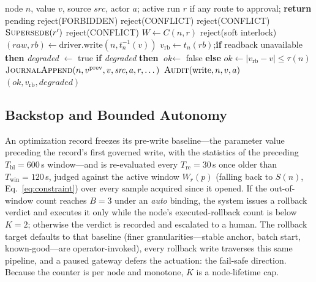 \begin{algorithm}[!t]
\caption{Governed write path $\textsc{Write}(n, v, \textit{src}, a)$}
\label{alg:write}
\begin{algorithmic}[1]
\Require node $n$, value $v$, source $\textit{src}$, actor $a$; active run $r$ if any
  \State route to approval; \textbf{return} pending 
\EndIf
{} \State \Return reject(FORBIDDEN)  \EndIf
{} \State \Return reject(CONFLICT) \EndIf
{}
   \State \Return reject(CONFLICT)
   \State $\textsc{Supersede}(r')$ \EndIf
   \State \Return reject(CONFLICT) \EndIf
\EndIf
\State $W \gets C(n, r)$ 
 \State \Return reject(soft interlock) \EndIf
\State $(\textit{raw}, \textit{rb}) \gets \text{driver.write}(n, t_n^{-1}(v))$
\State $v_{\text{rb}} \gets t_n(\textit{rb})$;\quad \textbf{if} readback unavailable \textbf{then} \textit{degraded} $\gets$ true
\State \textbf{if} \textit{degraded} \textbf{then} $\textit{ok} \gets$ false \textbf{else} $\textit{ok} \gets |v_{\text{rb}} - v| \le \tau(n)$ 
  \State $\textsc{JournalAppend}(n, v^{\text{prev}}, v, \textit{src}, a, r, \dots)$ 
  \State $\textsc{Audit}(\text{write}, n, v, a)$ 
  \State \Return $(\textit{ok}, v_{\text{rb}}, \textit{degraded})$
\end{algorithmic}
\end{algorithm}

\subsection{Backstop and Bounded Autonomy}
An optimization record freezes its pre-write baseline---the parameter value preceding the record's first governed write, with the statistics of the preceding $T_{\text{bl}} = 600$\,s window---and is re-evaluated every $T_{\text{re}} = 30$\,s once older than $T_{\text{win}} = 120$\,s, judged against the active window $W_r(p)$ (falling back to $S(n)$, Eq.~\eqref{eq:constraint}) over every sample acquired since it opened. If the out-of-window count reaches $B = 3$ under an \emph{auto} binding, the system issues a rollback verdict and executes it only while the node's executed-rollback count is below $K = 2$; otherwise the verdict is recorded and escalated to a human. The rollback target defaults to that baseline (finer granularities---stable anchor, batch start, known-good---are operator-invoked), every rollback write traverses this same pipeline, and a paused gateway defers the actuation: the fail-safe direction. Because the counter is per node and monotone, $K$ is a node-lifetime cap.

